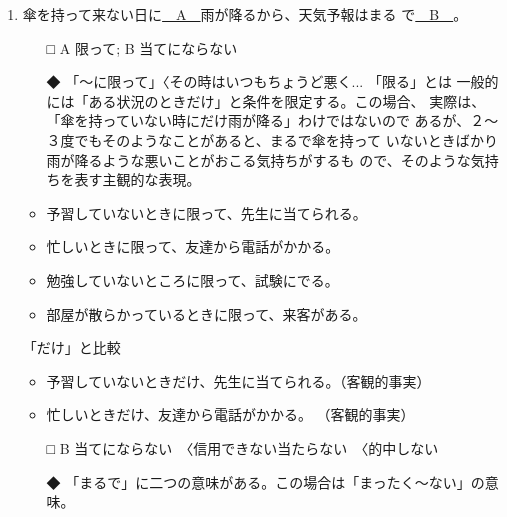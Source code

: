 \documentclass[
uplatex,
b5paper,
10pt,
dvipdfmx
]{jsbook}
\begin{document}
\begin{enumerate}
\setcounter{enumi}{0}

 \item 傘を持って来ない日に\underline{　A　}雨が降るから、天気予報はまる
       で\underline{　B　}。

 \begin{itemize}
  \item[□] A 限って; B 当てにならない
  \item[◆] 「〜に限って」〈その時はいつもちょうど悪く...  「限る」とは
	    一般的には「ある状況のときだけ」と条件を限定する。この場合、
	    実際は、「傘を持っていない時にだけ雨が降る」わけではないので
	    あるが、２〜３度でもそのようなことがあると、まるで傘を持って
	    いないときばかり雨が降るような悪いことがおこる気持ちがするも
	    ので、そのような気持ちを表す主観的な表現。
 \end{itemize}

 \begin{itemize}
  \item 予習していないときに限って、先生に当てられる。
  \item 忙しいときに限って、友達から電話がかかる。
  \item 勉強していないところに限って、試験にでる。
  \item 部屋が散らかっているときに限って、来客がある。
 \end{itemize}

「だけ」と比較
 \begin{itemize}
  \item 予習していないときだけ、先生に当てられる。（客観的事実）
  \item 忙しいときだけ、友達から電話がかかる。     （客観的事実）
 \end{itemize}

 \begin{itemize}
  \item[□] B 当てにならない　〈信用できない当たらない　〈的中しない
  \item[◆]「まるで」に二つの意味がある。この場合は「まったく〜ない」の意味。
 \end{itemize}


\end{enumerate}
\end{document}
